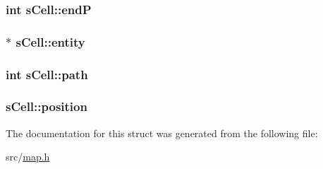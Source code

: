 \subsubsection[{end\+P}]{\setlength{\rightskip}{0pt plus 5cm}int s\+Cell\+::end\+P}\label{structs_cell_a6ec923340fb62915663be3fb0015f3cd}
\hypertarget{structs_cell_a9304c71735ad125198fc7bb3070e7bc4}{}
\subsubsection[{entity}]{$\ast$ s\+Cell\+::entity}\label{structs_cell_a9304c71735ad125198fc7bb3070e7bc4}
\hypertarget{structs_cell_a03358119a2ac874f7d85b94d7b651a6c}{}
\subsubsection[{path}]{\setlength{\rightskip}{0pt plus 5cm}int s\+Cell\+::path}\label{structs_cell_a03358119a2ac874f7d85b94d7b651a6c}
\hypertarget{structs_cell_a7b1e23f03b64816ca088b2f63082975b}{}
\subsubsection[{position}]{ s\+Cell\+::position}\label{structs_cell_a7b1e23f03b64816ca088b2f63082975b}


The documentation for this struct was generated from the following file\+:\begin{DoxyCompactItemize}
\item 
src/\hyperlink{map_8h}{map.\+h}\end{DoxyCompactItemize}
